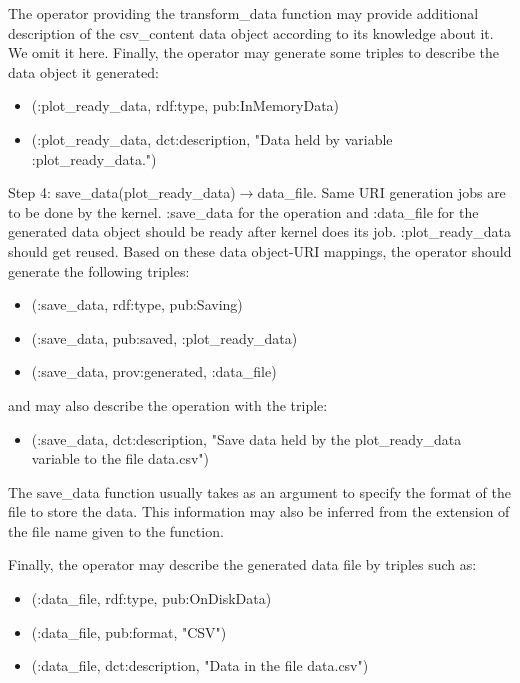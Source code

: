 The operator providing the transform\_data function may provide additional description of the csv\_content data object according to its knowledge about it. We omit it here. Finally, the operator may generate some triples to describe the data object it generated:
\begin{itemize}
	\item (:plot\_ready\_data, rdf:type, pub:InMemoryData)
	\item (:plot\_ready\_data, dct:description, "Data held by variable :plot\_ready\_data.")
\end{itemize}

Step 4: save\_data(plot\_ready\_data)$\rightarrow$data\_file. Same URI generation jobs are to be done by the kernel. :save\_data for the operation and :data\_file for the generated data object should be ready after kernel does its job. :plot\_ready\_data should get reused. Based on these data object-URI mappings, the operator should generate the following triples:
\begin{itemize}
	\item (:save\_data, rdf:type, pub:Saving)
	\item (:save\_data, pub:saved, :plot\_ready\_data)
	\item (:save\_data, prov:generated, :data\_file)
\end{itemize}
and may also describe the operation with the triple:
\begin{itemize}
	\item (:save\_data, dct:description, "Save data held by the plot\_ready\_data variable to the file data.csv")
\end{itemize}
The save\_data function usually takes as an argument to specify the format of the file to store the data. This information may also be inferred from the extension of the file name given to the function.

Finally, the operator may describe the generated data file by triples such as:
\begin{itemize}
	\item (:data\_file, rdf:type, pub:OnDiskData)
	\item (:data\_file, pub:format, "CSV")
	\item (:data\_file, dct:description, "Data in the file data.csv")
\end{itemize}

